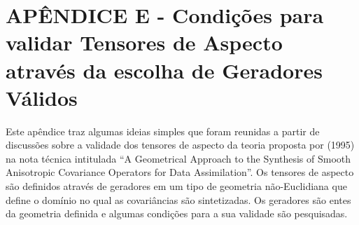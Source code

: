 

\chapter{APÊNDICE E - Condições para validar Tensores de Aspecto através da escolha de Geradores Válidos}
\label{apendiceVII}


Este apêndice traz algumas ideias simples que foram reunidas a partir de discussões sobre a validade dos tensores de aspecto da teoria proposta por  (1995) na nota técnica intitulada ``A Geometrical Approach to the Synthesis of Smooth Anisotropic Covariance Operators for Data Assimilation''. Os tensores de aspecto são definidos através de geradores em um tipo de geometria não-Euclidiana que define o domínio no qual as covariâncias são sintetizadas. Os geradores são entes da geometria definida e algumas condições para a sua validade são pesquisadas. 

